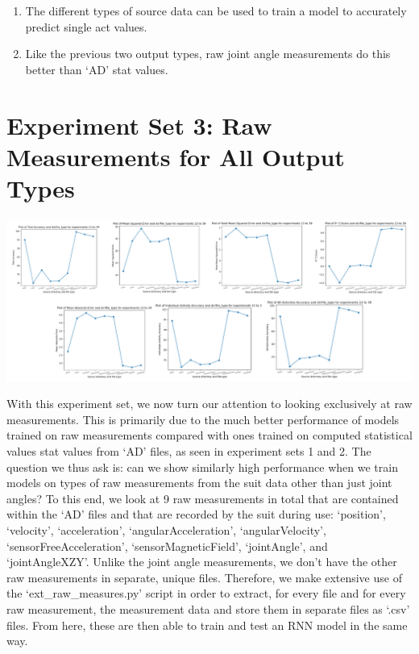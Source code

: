 \documentclass[12pt,twoside]{report}
\begin{document}
\begin{enumerate}
	\item The different types of source data can be used to train a model to accurately predict single act values.
	\item Like the previous two output types, raw joint angle measurements do this better than ‘AD’ stat values.
\end{enumerate}




\section{Experiment Set 3: Raw Measurements for All Output Types}

\begin{center}
\includegraphics[scale=0.4]{project_figures/fig10_9}
\end{center}

\quad With this experiment set, we now turn our attention to looking exclusively at raw measurements. This is primarily due to the much better performance of models trained on raw measurements compared with ones trained on computed statistical values stat values from ‘AD’ files, as seen in experiment sets 1 and 2. The question we thus ask is: can we show similarly high performance when we train models on types of raw measurements from the suit data other than just joint angles? To this end, we look at 9 raw measurements in total that are contained within the ‘AD’ files and that are recorded by the suit during use: ‘position’, ‘velocity’, ‘acceleration’, ‘angularAcceleration’, ‘angularVelocity’, ‘sensorFreeAcceleration’, ‘sensorMagneticField’, ‘jointAngle’, and ‘jointAngleXZY’. Unlike the joint angle measurements, we don’t have the other raw measurements in separate, unique files. Therefore, we make extensive use of the ‘ext\_raw\_measures.py’ script in order to extract, for every file and for every raw measurement, the measurement data and store them in separate files as ‘.csv’ files. From here, these are then able to train and test an RNN model in the same way.\\
\end{document}
